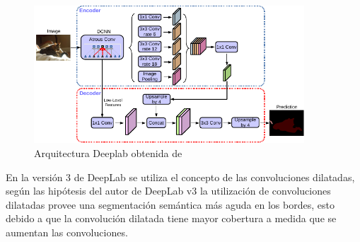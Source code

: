 \begin{figure}[H]
    \centering
    \includegraphics[width = 0.9\textwidth]{images/redes/deeplab.pdf}
    \caption{Arquitectura Deeplab obtenida de \cite{Chen2018}}
    \label{fig:my_label}
\end{figure}{}
En la versión 3 de DeepLab se utiliza el concepto de las convoluciones dilatadas, según las hipótesis del autor de DeepLab v3 la utilización de convoluciones dilatadas provee una segmentación semántica más aguda en los bordes, esto debido a que la convolución dilatada tiene mayor cobertura a medida que se aumentan las convoluciones.



% 